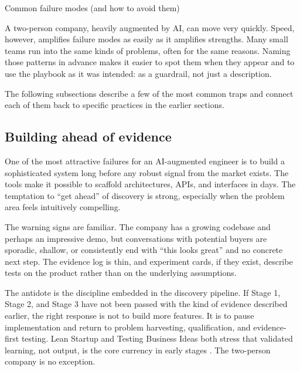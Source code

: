 \documentclass[10pt, a4paper, twocolumn]{article} %
\makeatletter
\let\orig@section\section %
\renewcommand{\section}{%
  \@ifstar{\orig@section*}{\unnumberedsteppingsection}%
}
\newcommand{\unnumberedsteppingsection}[1]{%
  \refstepcounter{section}%
  \orig@section*{#1}%
}
\makeatother
\begin{document}
\clearpage

\section{Common failure modes (and how to avoid them)}

A two-person company, heavily augmented by AI, can move very quickly. Speed, however, amplifies failure modes as easily as it amplifies strengths. Many small teams run into the same kinds of problems, often for the same reasons. Naming those patterns in advance makes it easier to spot them when they appear and to use the playbook as it was intended: as a guardrail, not just a description.

The following subsections describe a few of the most common traps and connect each of them back to specific practices in the earlier sections.

\subsection{Building ahead of evidence}

One of the most attractive failures for an AI-augmented engineer is to build a sophisticated system long before any robust signal from the market exists. The tools make it possible to scaffold architectures, APIs, and interfaces in days. The temptation to “get ahead” of discovery is strong, especially when the problem area feels intuitively compelling.

The warning signs are familiar. The company has a growing codebase and perhaps an impressive demo, but conversations with potential buyers are sporadic, shallow, or consistently end with “this looks great” and no concrete next step. The evidence log is thin, and experiment cards, if they exist, describe tests on the product rather than on the underlying assumptions.

The antidote is the discipline embedded in the discovery pipeline. If Stage 1, Stage 2, and Stage 3 have not been passed with the kind of evidence described earlier, the right response is not to build more features. It is to pause implementation and return to problem harvesting, qualification, and evidence-first testing. Lean Startup and Testing Business Ideas both stress that validated learning, not output, is the core currency in early stages \citep{ries2011lean,bland2019testing}. The two-person company is no exception.
\end{document}

